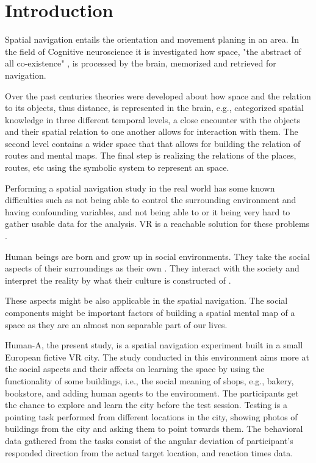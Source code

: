 \chapter{Introduction}

Spatial navigation entails the orientation and movement planing in an area. In the field of Cognitive neuroscience it is investigated how space, "the abstract of all co-existence" \autocite{spencer1989}, is processed by the brain, memorized and retrieved for navigation. 

Over the past centuries theories were developed about how space and the relation to its objects, thus distance, is represented in the brain, e.g., \textcite{cassirer1955philosophy} categorized spatial knowledge in three different temporal levels, a close encounter with the objects and their spatial relation to one another allows for interaction with them. The second level contains a wider space that that allows for building the relation of routes and mental maps. The final step is realizing the relations of the places, routes, etc using the symbolic system to represent an space. 

Performing a spatial navigation study in the real world has some known difficulties such as not being able to control the surrounding environment and having confounding variables, and not being able to or it being very hard to gather usable data for the analysis. VR is a reachable solution for these problems \textcite{10.1242/jeb.187252}. 

Human beings are born and grow up in social environments. They take the social aspects of their surroundings as their own \autocite{berger1967luckman}. They interact with the society and interpret the reality by what their culture is constructed of \autocite{SIEGEL19759}. 

These aspects might be also applicable in the spatial navigation. The social components might be important factors of building a spatial mental map of a space as they are an almost non separable part of our lives. 

Human-A, the present study, is a spatial navigation experiment built in a small European fictive VR city. The study conducted in this environment aims more at the social aspects and their affects on learning the space by using the functionality of some buildings, i.e., the social meaning of shops, e.g., bakery, bookstore, and adding human agents to the environment. The participants get the chance to explore and learn the city before the test session. Testing is a pointing task performed from different locations in the city, showing photos of buildings from the city and asking them to point towards them. The behavioral data gathered from the tasks consist of the angular deviation of participant's responded direction from the actual target location, and reaction times data.


